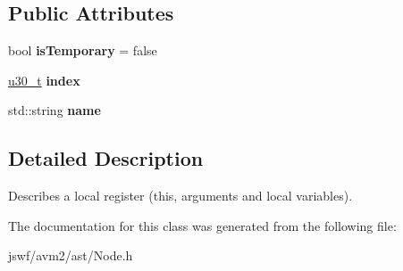 \subsection*{Public Attributes}
\begin{DoxyCompactItemize}
\item 
\hypertarget{classjswf_1_1avm2_1_1ast_1_1_local_node_ab1dbfacd9a0bca73090105a142e0e687}{bool {\bfseries is\+Temporary} = false}\label{classjswf_1_1avm2_1_1ast_1_1_local_node_ab1dbfacd9a0bca73090105a142e0e687}

\item 
\hypertarget{classjswf_1_1avm2_1_1ast_1_1_local_node_a84dfe94d05763357c50d7058f6a002e0}{\hyperlink{namespacejswf_aa10d9ddca2a6a5debdc261dfae3d1117}{u30\+\_\+t} {\bfseries index}}\label{classjswf_1_1avm2_1_1ast_1_1_local_node_a84dfe94d05763357c50d7058f6a002e0}

\item 
\hypertarget{classjswf_1_1avm2_1_1ast_1_1_local_node_a9705e8cd202c70cf19db02f3ba5745d6}{std\+::string {\bfseries name}}\label{classjswf_1_1avm2_1_1ast_1_1_local_node_a9705e8cd202c70cf19db02f3ba5745d6}

\end{DoxyCompactItemize}


\subsection{Detailed Description}
Describes a local register ({\ttfamily this}, arguments and local variables). 

The documentation for this class was generated from the following file\+:\begin{DoxyCompactItemize}
\item 
jswf/avm2/ast/Node.\+h\end{DoxyCompactItemize}
